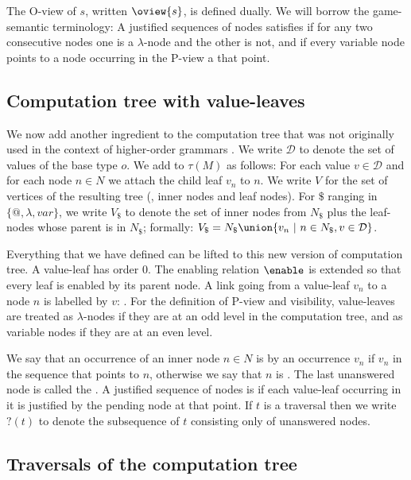 The O-view of $s$, written $\oview{s}$, is defined dually. We will
borrow the game-semantic terminology: A justified sequences of nodes
satisfies  if for any two consecutive nodes one
is a $\lambda$-node and the other is not, and 
if every variable node points to a node occurring in the P-view a
that point.

\subsection{Computation tree with value-leaves}


We now add another ingredient to the computation tree that was not
originally used in the context of higher-order grammars \cite{OngLics2006}.  We write $\mathcal{D}$ to
denote the set of values of the base type $o$.  We add
 to $\tau(M)$ as follows: For each value $v
\in \mathcal{D}$ and for each node $n \in N$ we attach the child
leaf $v_n$ to $n$.  We write $V$ for the set of vertices of the
resulting tree (\ie, inner nodes and leaf nodes). For $\$$ ranging in
$\{@, \lambda, var \}$, we write $V_\$$ to denote the set of inner
nodes from $N_\$$ plus the leaf-nodes whose parent is in $N_\$$; formally:
$V_\$ = N_\$ \union \{ v_n \ | \ n \in N_\$, v \in \mathcal{D} \}$.


Everything that we have defined can be lifted to this new version of
computation tree. A value-leaf has order $0$. The enabling relation
$\enable$ is extended so that every leaf is enabled by its parent
node. A link going from a value-leaf $v_n$ to a node $n$ is labelled
by $v$: . For the
definition of P-view and visibility, value-leaves are treated as
$\lambda$-nodes if they are at an odd level in the computation tree,
and as variable nodes if they are at an even level.

We say that an occurrence of an inner node $n \in N$ is
 by an occurrence $v_n$ if $v_n$ in
the sequence that points to $n$, otherwise we say that $n$ is
. The last unanswered node is called the
.  A justified sequence of nodes is
 if each value-leaf occurring in it is justified by the pending node at that point.  If $t$ is a traversal then we write
$?(t)$ to denote the subsequence of $t$ consisting only of
unanswered nodes.

\subsection{Traversals of the computation tree}
\label{subsec:traversal}

